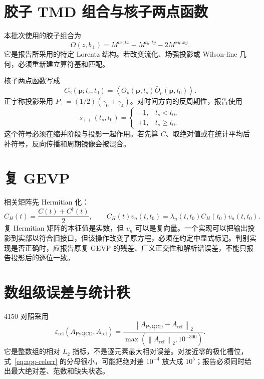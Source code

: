 \section{胶子 TMD 组合与核子两点函数}
\label{app:b09-correlators}

本批次使用的胶子组合为
\begin{equation}
  O(z,b_\perp)=M^{tx;tx}+M^{ty;ty}-2M^{xy;xy}.
  \label{eq:app-tmd-operator}
\end{equation}
它是报告所采用的特定 Lorentz 结构。若改变流化、场强投影或 Wilson-line 几何，必须重新建立算符基和匹配。

核子两点函数写成
\begin{equation}
  C_2(\boldsymbol p;t_s,t_0)=
  \left\langle O_p(\boldsymbol p,t_s)\bar O_p(\boldsymbol p,t_0)\right\rangle .
  \label{eq:app-c2}
\end{equation}
正宇称投影采用 \(P_+=(1/2)(\gamma_0+\gamma_4)\)。对时间方向的反周期性，报告使用
\begin{equation}
  s_{++}(t_s,t_0)=
  \begin{cases}
    -1,&t_s<t_0,\\
    +1,&t_s\ge t_0.
  \end{cases}
  \label{eq:app-boundary-sign}
\end{equation}
这个符号必须在缩并阶段与投影一起作用。若先算 \(C\)、取绝对值或在统计平均后补符号，反向传播和周期镜像会被混合。

\section{复 GEVP}
\label{app:b09-gevp}

相关矩阵先 Hermitian 化：
\begin{equation}
  C_H(t)=\frac{C(t)+C^\dagger(t)}{2},
  \qquad
  C_H(t)v_n(t,t_0)=\lambda_n(t,t_0)C_H(t_0)v_n(t,t_0).
  \label{eq:app-gevp}
\end{equation}
复 Hermitian 矩阵的本征值是实数，但 \(v_n\) 可以是复向量。一个实现可以把输出投影到实部以符合旧接口，但该操作改变了原方程，必须在约定中显式标记。判别实现是否正确时，应报告原复 GEVP 的残差、广义正交性和解析谱误差，不能只报告投影后的逐位一致。

\section{数组级误差与统计秩}
\label{app:b09-error}

4150 对照采用
\begin{equation}
  \varepsilon_{\mathrm{rel}}(A_{\mathrm{PyQCD}},A_{\mathrm{ref}})
  =\frac{\left\|A_{\mathrm{PyQCD}}-A_{\mathrm{ref}}\right\|_2}
  {\max\left(\left\|A_{\mathrm{ref}}\right\|_2,10^{-300}\right)} .
  \label{eq:app-relerr}
\end{equation}
它是整数组的相对 \(L_2\) 指标，不是逐元素最大相对误差。对接近零的极化槽位，式~\eqref{eq:app-relerr} 的分母很小，可能把绝对差 \(10^{-4}\) 放大成 \(10^5\)；报告必须同时给出最大绝对差、范数和缺失状态。

